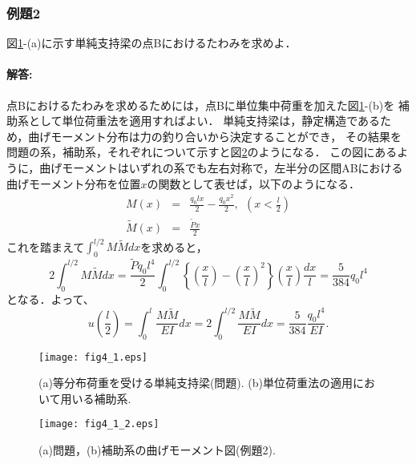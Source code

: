 \documentclass[10pt,a4j]{jarticle}
\begin{document}
\subsubsection{例題2}
	図\ref{fig:fig2_5}-(a)に示す単純支持梁の点Bにおけるたわみを求めよ．
\paragraph{解答:}
	点Bにおけるたわみを求めるためには，点Bに単位集中荷重を加えた図\ref{fig:fig2_5}-(b)を
	補助系として単位荷重法を適用すればよい．
	単純支持梁は，静定構造であるため，曲げモーメント分布は力の釣り合いから決定することができ，
	その結果を問題の系，補助系，それぞれについて示すと図\ref{fig:fig2_6}のようになる．
	この図にあるように，曲げモーメントはいずれの系でも左右対称で，左半分の区間ABにおける
	曲げモーメント分布を位置$x$の関数として表せば，以下のようになる．
	\begin{eqnarray}
		M(x) &=& \frac{q_0lx}{2}-\frac{q_0x^2}{2}, \ \ \left(x<\frac{l}{2}\right) \\
		\tilde M(x) &=& \frac{\tilde P x}{2}
		\label{eqn:}
	\end{eqnarray}
	これを踏まえて$\int_0^{l/2} M\tilde Mdx$を求めると，
	\begin{equation}
		2\int_0^{l/2} M\tilde Mdx
		=\frac{\tilde Pq_0l^4}{2}
		\int_0^{l/2} 
		\left\{
			\left(\frac{x}{l}\right)- \left(\frac{x}{l} \right)^2
		\right\}
			\left(\frac{x}{l}\right)
		\frac{dx}{l}
		=\frac{5}{384}q_0l^4
		\label{eqn:}
	\end{equation}
	となる．よって、
	\begin{equation}
		u\left(\frac{l}{2}\right)=
		\int_0^l \frac{M\tilde M}{EI}dx=
		2\int_0^{l/2} \frac{M\tilde M}{EI}dx
		=\frac{5}{384}\frac{q_0l^4}{EI}
		.
		\label{eqn:}
	\end{equation}
\begin{figure}[h]
	\begin{center}
	\texttt{[image: fig4\_1.eps]} 
	\end{center}
	\caption{(a)等分布荷重を受ける単純支持梁(問題).
	 (b)単位荷重法の適用において用いる補助系.} 
	\label{fig:fig2_5}
\end{figure}
\begin{figure}[h]
	\begin{center}
	\texttt{[image: fig4\_1\_2.eps]} 
	\end{center}
	\caption{(a)問題，(b)補助系の曲げモーメント図(例題2).}
	\label{fig:fig2_6}
\end{figure}
\end{document}
